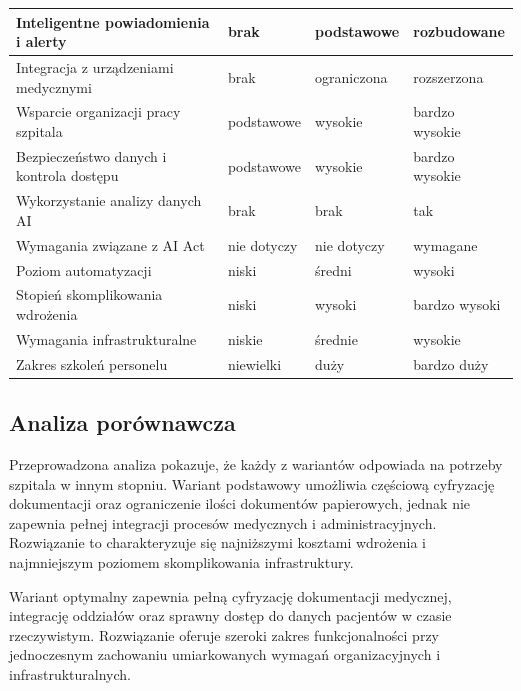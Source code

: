 \begin{longtable}{|p{4cm}|p{3cm}|p{3cm}|p{3cm}|}
Inteligentne powiadomienia i alerty &
brak &
podstawowe &
rozbudowane \\
\hline

Integracja z urządzeniami medycznymi &
brak &
ograniczona &
rozszerzona \\
\hline

Wsparcie organizacji pracy szpitala &
podstawowe &
wysokie &
bardzo wysokie \\
\hline

Bezpieczeństwo danych i kontrola dostępu &
podstawowe &
wysokie &
bardzo wysokie \\
\hline

Wykorzystanie analizy danych AI &
brak &
brak &
tak \\
\hline

Wymagania związane z AI Act &
nie dotyczy &
nie dotyczy &
wymagane \\
\hline

Poziom automatyzacji &
niski &
średni &
wysoki \\
\hline

Stopień skomplikowania wdrożenia &
niski &
wysoki &
bardzo wysoki \\
\hline

Wymagania infrastrukturalne &
niskie &
średnie &
wysokie \\
\hline

Zakres szkoleń personelu &
niewielki &
duży &
bardzo duży \\
\hline

\end{longtable}

\subsection{Analiza porównawcza}

Przeprowadzona analiza pokazuje, że każdy z wariantów odpowiada na potrzeby szpitala w innym stopniu. Wariant podstawowy umożliwia częściową cyfryzację dokumentacji oraz ograniczenie ilości dokumentów papierowych, jednak nie zapewnia pełnej integracji procesów medycznych i administracyjnych. Rozwiązanie to charakteryzuje się najniższymi kosztami wdrożenia i najmniejszym poziomem skomplikowania infrastruktury.

Wariant optymalny zapewnia pełną cyfryzację dokumentacji medycznej, integrację oddziałów oraz sprawny dostęp do danych pacjentów w czasie rzeczywistym. Rozwiązanie oferuje szeroki zakres funkcjonalności przy jednoczesnym zachowaniu umiarkowanych wymagań organizacyjnych i infrastrukturalnych.

